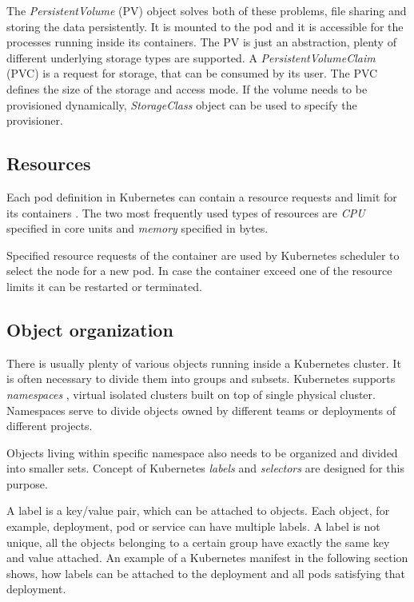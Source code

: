 \documentclass[
  digital, %
  twoside, %
  table,   %
  nolof,   %
  nolot,   %
]{fithesis3}
\begin{document}
The \textit{PersistentVolume} (PV) object solves both of these problems, file sharing and storing the data persistently. It is mounted to the pod and it is accessible for the processes running inside its containers. The PV is just an abstraction, plenty of different underlying storage types are supported. A \textit{PersistentVolumeClaim} (PVC) is a request for storage, that can be consumed by its user. The PVC defines the size of the storage and access mode. If the volume needs to be provisioned dynamically, \textit{StorageClass} \cite{storage-classes} object can be used to specify the provisioner.

\subsection{Resources} \label{sec:resources}
Each pod definition in Kubernetes can contain a resource requests and limit for its containers \cite{mcrc}. The two most frequently used types of resources are \textit{CPU} specified in core units and \textit{memory} specified in bytes.

Specified resource requests of the container are used by Kubernetes scheduler to select the node for a new pod. In case the container exceed one of the resource limits it can be restarted or terminated.

\subsection{Object organization} \label{sec:obj_organization}
There is usually plenty of various objects running inside a Kubernetes cluster. It is often necessary to divide them into groups and subsets. Kubernetes supports \textit{namespaces} \cite{namespaces}, virtual isolated clusters built on top of single physical cluster. Namespaces serve to divide objects owned by different teams or deployments of different projects.

Objects living within specific namespace also needs to be organized and divided into smaller sets. Concept of Kubernetes \textit{labels} and \textit{selectors} \cite{labels_selectors} are designed for this purpose.

A label is a key/value pair, which can be attached to objects. Each object, for example, deployment, pod or service can have multiple labels. A label is not unique, all the objects belonging to a certain group have exactly the same key and value attached. An example of a Kubernetes manifest in the following section shows, how labels can be attached to the deployment and all pods satisfying that deployment.
\end{document}
